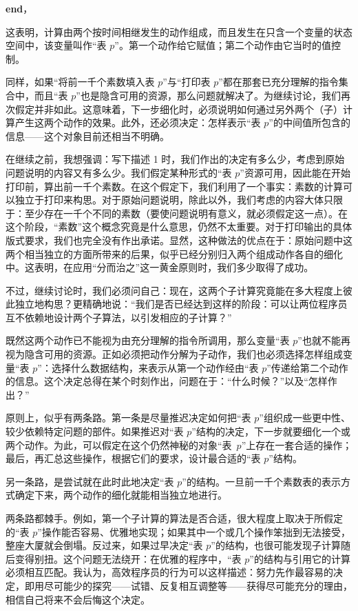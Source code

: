 \documentclass[twoside,11pt,fontset=none]{ctexbook}
\begin{document}
\textbf{end}，

\noindent
这表明，计算由两个按时间相继发生的动作组成，而且发生在只含一个变量的状态空间中，该变量叫作“表 $p$”。第一个动作给它赋值；第二个动作由它当时的值控制。

同样，如果“将前一千个素数填入表 $p$”与“打印表 $p$”都在那套已充分理解的指令集合中，而且“表 $p$”也是隐含可用的资源，那么问题就解决了。为继续讨论，我们再次假定并非如此。这意味着，下一步细化时，必须说明如何通过另外两个（子）计算产生这两个动作的效果。此外，还必须决定：怎样表示“表 $p$”的中间值所包含的信息——这个对象目前还相当不明确。

在继续之前，我想强调：写下描述 1 时，我们作出的决定有多么少，考虑到原始问题说明的内容又有多么少。我们假定某种形式的“表 $p$”资源可用，因此能在开始打印前，算出前一千个素数。在这个假定下，我们利用了一个事实：素数的计算可以独立于打印来构思。对于原始问题说明，除此以外，我们考虑的内容大体只限于：至少存在一千个不同的素数（要使问题说明有意义，就必须假定这一点）。在这个阶段，“素数”这个概念究竟是什么意思，仍然不太重要。对于打印输出的具体版式要求，我们也完全没有作出承诺。显然，这种做法的优点在于：原始问题中这两个相当独立的方面所带来的后果，似乎已经分别归入两个组成动作各自的细化中。这表明，在应用“分而治之”这一黄金原则时，我们多少取得了成功。

不过，继续讨论时，我们必须问自己：现在，这两个子计算究竟能在多大程度上彼此独立地构思？更精确地说：“我们是否已经达到这样的阶段：可以让两位程序员互不依赖地设计两个子算法，以引发相应的子计算？”

既然这两个动作已不能视为由充分理解的指令所调用，那么变量“表 $p$”也就不能再视为隐含可用的资源。正如必须把动作分解为子动作，我们也必须选择怎样组成变量“表 $p$”：选择什么数据结构，来表示从第一个动作经由“表 $p$”传递给第二个动作的信息。这个决定总得在某个时刻作出，问题在于：“什么时候？”以及“怎样作出？”

原则上，似乎有两条路。第一条是尽量推迟决定如何把“表 $p$”组织成一些更中性、较少依赖特定问题的部件。如果推迟对“表 $p$”结构的决定，下一步就要细化一个或两个动作。为此，可以假定在这个仍然神秘的对象\mbox{“表 $p$”}上存在一套合适的操作；最后，再汇总这些操作，根据它们的要求，设计最合适的“表 $p$”结构。

另一条路，是尝试就在此时此地决定“表 $p$”的结构。一旦前一千个素数表的表示方式确定下来，两个动作的细化就能相当独立地进行。

两条路都棘手。例如，第一个子计算的算法是否合适，很大程度上取决于所假定的“表 $p$”操作能否容易、优雅地实现；如果其中一个或几个操作笨拙到无法接受，整座大厦就会倒塌。反过来，如果过早决定“表 $p$”的结构，也很可能发现子计算随后变得别扭。这个问题无法绕开：在优雅的程序中，“表 $p$”的结构与引用它的计算必须相互匹配。我认为，高效程序员的行为可以这样描述：努力先作最容易的决定，即用尽可能少的探究——试错、反复相互调整等——获得尽可能充分的理由，相信自己将来不会后悔这个决定。
\end{document}
